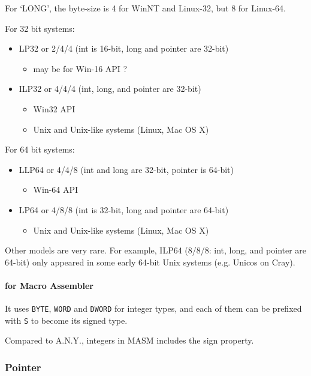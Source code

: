 For `LONG', the byte-size is 4 for WinNT and Linux-32, but 8 for Linux-64.


For 32 bit systems:
\begin{itemize}
	\item LP32 or 2/4/4 (int is 16-bit, long and pointer are 32-bit)\begin{itemize}
		\item may be for Win-16 API ?
	\end{itemize}
	\item ILP32 or 4/4/4 (int, long, and pointer are 32-bit)\begin{itemize}
		\item Win32 API
		\item Unix and Unix-like systems (Linux, Mac OS X)
	\end{itemize}
\end{itemize}

For 64 bit systems:
\begin{itemize}
	\item LLP64 or 4/4/8 (int and long are 32-bit, pointer is 64-bit)\begin{itemize}
		\item Win-64 API
	\end{itemize}
	\item LP64 or 4/8/8 (int is 32-bit, long and pointer are 64-bit)\begin{itemize}
		\item Unix and Unix-like systems (Linux, Mac OS X)
	\end{itemize}
\end{itemize}

Other models are very rare. For example, ILP64 (8/8/8: int, long, and pointer are 64-bit) only appeared in some early 64-bit Unix systems (e.g. Unicos on Cray).

\paragraph{for Macro Assembler}
It uses \verb`BYTE`, \verb`WORD` and \verb`DWORD` for integer types, and each of them can be prefixed with \verb`S` to become its signed type.

Compared to A.N.Y., integers in MASM includes the sign property.

\subsubsection{Pointer}

